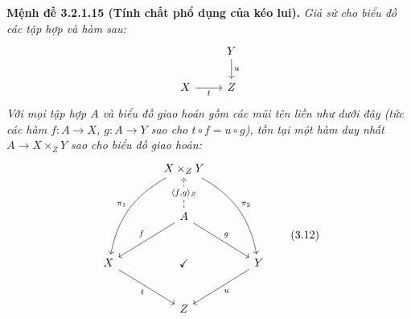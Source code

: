 \noindent\textbf{Mệnh đề 3.2.1.15 (Tính chất phổ dụng của kéo lui).} \emph{Giả sử cho biểu đồ các tập hợp và hàm sau:}
\[\begin{tikzcd}&Y\arrow[d,"u"]\\X\arrow[r,"t"']&Z\end{tikzcd}\]
\emph{Với mọi tập hợp $A$ và biểu đồ giao hoán gồm các mũi tên liền như dưới đây (tức các hàm $f:A\to X$, $g:A\to Y$ sao cho $t\circ f=u\circ g$), tồn tại một hàm duy nhất $A\to X\times_ZY$ sao cho biểu đồ giao hoán:}
\begin{equation*}\begin{tikzcd}[column sep=large,row sep=large]
&X\times_ZY\arrow[ddl,bend right=25,"\pi_1"']\arrow[ddr,bend left=25,"\pi_2"]&\\
&A\arrow[u,dashed,"{\langle f,g\rangle_Z}" description]\arrow[dl,"f"']\arrow[dr,"g"]&\\
X\arrow[dr,"t"']\arrow[rr,phantom,"\checkmark" description]&&Y\arrow[dl,"u"]\\&Z&
\end{tikzcd}\tag{3.12}\end{equation*}

